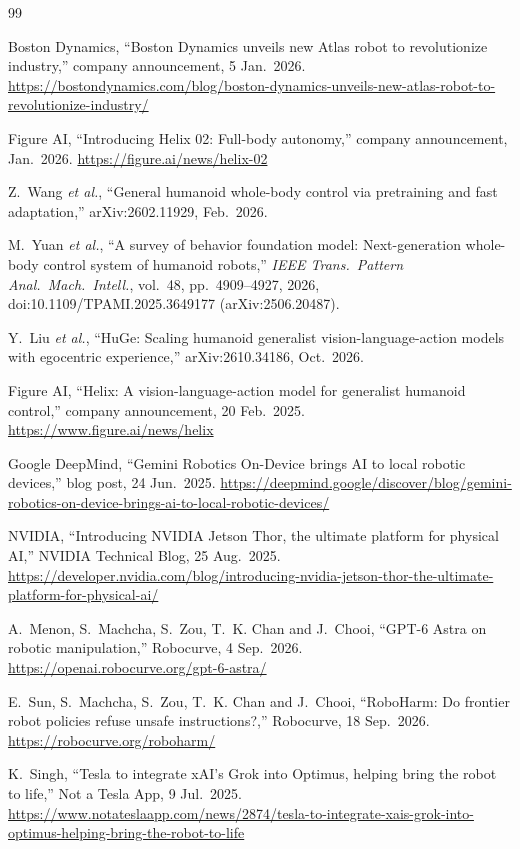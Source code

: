 \documentclass[11pt,a4paper]{article}
\begin{document}
\begin{thebibliography}{99}

Boston Dynamics, ``Boston Dynamics unveils new Atlas robot to revolutionize
industry,'' company announcement, 5 Jan.\ 2026.
\url{https://bostondynamics.com/blog/boston-dynamics-unveils-new-atlas-robot-to-revolutionize-industry/}

Figure AI, ``Introducing Helix 02: Full-body autonomy,'' company
announcement, Jan.\ 2026.
\url{https://figure.ai/news/helix-02}

Z.~Wang \emph{et al.}, ``General humanoid whole-body control via pretraining
and fast adaptation,'' arXiv:2602.11929, Feb.\ 2026.

M.~Yuan \emph{et al.}, ``A survey of behavior foundation model:
Next-generation whole-body control system of humanoid robots,''
\emph{IEEE Trans.\ Pattern Anal.\ Mach.\ Intell.}, vol.~48, pp.~4909--4927,
2026, doi:10.1109/TPAMI.2025.3649177 (arXiv:2506.20487).

Y.~Liu \emph{et al.}, ``HuGe: Scaling humanoid generalist
vision-language-action models with egocentric experience,''
arXiv:2610.34186, Oct.\ 2026.

Figure AI, ``Helix: A vision-language-action model for generalist humanoid
control,'' company announcement, 20 Feb.\ 2025.
\url{https://www.figure.ai/news/helix}

Google DeepMind, ``Gemini Robotics On-Device brings AI to local robotic
devices,'' blog post, 24 Jun.\ 2025.
\url{https://deepmind.google/discover/blog/gemini-robotics-on-device-brings-ai-to-local-robotic-devices/}

NVIDIA, ``Introducing NVIDIA Jetson Thor, the ultimate platform for physical
AI,'' NVIDIA Technical Blog, 25 Aug.\ 2025.
\url{https://developer.nvidia.com/blog/introducing-nvidia-jetson-thor-the-ultimate-platform-for-physical-ai/}

A.~Menon, S.~Machcha, S.~Zou, T.~K. Chan and J.~Chooi, ``GPT-6 Astra on
robotic manipulation,'' Robocurve, 4 Sep.\ 2026.
\url{https://openai.robocurve.org/gpt-6-astra/}

E.~Sun, S.~Machcha, S.~Zou, T.~K. Chan and J.~Chooi, ``RoboHarm: Do frontier
robot policies refuse unsafe instructions?,'' Robocurve, 18 Sep.\ 2026.
\url{https://robocurve.org/roboharm/}

K.~Singh, ``Tesla to integrate xAI's Grok into Optimus, helping bring the
robot to life,'' Not a Tesla App, 9 Jul.\ 2025.
\url{https://www.notateslaapp.com/news/2874/tesla-to-integrate-xais-grok-into-optimus-helping-bring-the-robot-to-life}


\end{thebibliography}
\end{document}
